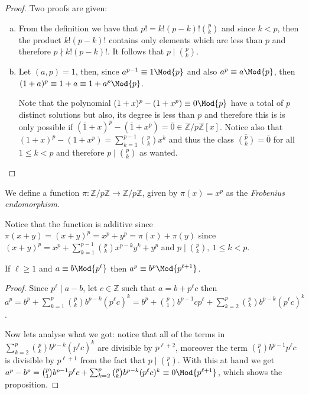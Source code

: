 \begin{proof}
   Two proofs are given:
   \begin{enumerate}[(a)]
      \item From the definition we have that \(p! = k!(p-k)!\binom{p}{k}\) and
         since \(k < p\), then the  product \(k! (p-k)!\) contains only elements
         which are less than \(p\) and therefore \(p \nmid k! (p-k)!\). It
         follows that \(p \mid \binom{p}{k}\).
      \item Let \((a, p) = 1\), then, since \(a^{p-1} \equiv 1 \Mod{p}\) and
         also  \(a^p \equiv a \Mod{p}\), then  \((1+a)^{p} \equiv 1+a \equiv 1 +
         a^p \Mod{p}\).

         Note that the polynomial \((1+x)^p - (1+x^p) \equiv 0 \Mod{p}\) have a
         total of \(p\) distinct solutions but also, its degree is less than
         \(p\) and therefore this is is only possible if \((\overline{1}+x)^p -
         (\overline{1}+x^p) = \overline{0} \in \mathbb{Z}/p\mathbb{Z}[x]\).
         Notice also that \((1+x)^p - (1+x^p) = \sum_{k=1}^{p-1}
         \binom{p}{k}x^k\) and thus the class \(\overline{\binom{p}{k}} =
         \overline{0}\) for all \(1 \leqslant k < p\) and therefore \(p \mid
         \binom{p}{k}\) as wanted.
   \end{enumerate}
\end{proof}

\begin{definition}
   We define a function \(\pi : \mathbb{Z}/p\mathbb{Z} \to
   \mathbb{Z}/p\mathbb{Z}\), given by \(\pi(x) = x^p\) as the \emph{Frobenius
   endomorphism}.

   Notice that the function is additive since  \(\pi(x + y) = (x+y)^p = x^p +
   y^p = \pi(x) + \pi(y)\) since \((x + y)^p = x^p + \sum_{k=1}^{p-1}
   \binom{p}{k} x^{p-k}y^{k} + y^p\) and  \(p \mid \binom{p}{k},\ 1
   \leqslant k < p\).
\end{definition}

\begin{lemma}
   If \(\ell \geqslant  1\)  and \(a \equiv b \Mod{p^\ell}\) then \(a^p \equiv
   b^p \Mod{p^{\ell+1}}\).
\end{lemma}

\begin{proof}
   Since \(p^\ell \mid a - b\), let \(c \in \mathbb{Z}\) such that \(a = b +
   p^\ell c\) then \(a^p = b^p + \sum_{k=1}^{p} \binom{p}{k} b^{p-k}(p^\ell
   c)^k = b^p + \binom{p}{1} b^{p-1} cp^\ell + \sum_{k=2}^{p} \binom{p}{k}
   b^{p-k} (p^\ell c)^{k}\).

   Now lets analyse what we got: notice that all of the terms in \(\sum_{k=2}^p
   \binom{p}{k} b^{p-k} (p^{\ell} c)^k\) are divisible by \(p^{\ell+2}\),
   moreover the term \(\binom{p}{1} b^{p-1} p^\ell c\) is divisible by
   \(p^{\ell+1}\) from the fact that \(p \mid \binom{p}{1}\). With this at hand
   we get \(a^p - b^p = \binom{p}{1} b^{p-1} p^\ell c + \sum_{k=2}^p
   \binom{p}{k} b^{p-k} (p^\ell c)^k \equiv 0 \Mod{p^{\ell+1}}\), which shows
   the proposition.
\end{proof}

